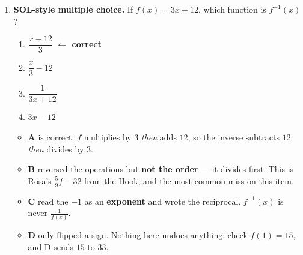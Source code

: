 \documentclass[10pt]{article}
\begin{document}
\begin{enumerate}[leftmargin=1.8em, itemsep=10pt]
  \item \textbf{SOL-style multiple choice.} If $f(x)=3x+12$, which function is $f^{-1}(x)$?
        \begin{enumerate}[label=\Alph*., leftmargin=1.9em, itemsep=1pt]
          \item $\dfrac{x-12}{3}$ \quad \textcolor{keyred}{\textbf{$\leftarrow$ correct}}
          \item $\dfrac{x}{3}-12$
          \item $\dfrac{1}{3x+12}$
          \item $3x-12$
        \end{enumerate}
        \vspace{2pt}
        \begin{itemize}[leftmargin=1.4em, nosep]
          \item \textbf{A} is correct: $f$ multiplies by $3$ \emph{then} adds $12$, so the inverse
                subtracts $12$ \emph{then} divides by $3$.
          \item \textbf{B} reversed the operations but \textbf{not the order} --- it divides first.
                This is Rosa's $\frac59f-32$ from the Hook, and the most common miss on this item.
          \item \textbf{C} read the $-1$ as an \textbf{exponent} and wrote the reciprocal.
                $f^{-1}(x)$ is never $\frac{1}{f(x)}$.
          \item \textbf{D} only flipped a sign. Nothing here undoes anything: check $f(1)=15$, and
                D sends $15$ to $33$.
        \end{itemize}
\end{enumerate}
\end{document}

